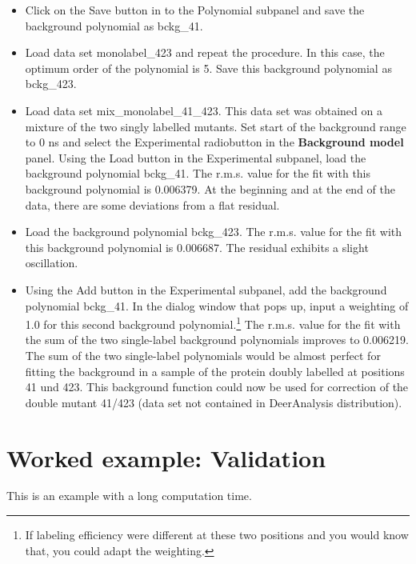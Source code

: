 \documentclass[11pt,a4paper]{article}
\begin{document}
\begin{itemize}
	\item Click on the {\ttfamily Save} button in to the {\ttfamily Polynomial} subpanel and save the background polynomial as {\ttfamily bckg\_41}.  
	\item Load data set {\ttfamily monolabel\_423} and repeat the procedure. In this case, the optimum order of the polynomial is 5. Save this background polynomial as {\ttfamily bckg\_423}.
	\item Load data set {\ttfamily mix\_monolabel\_41\_423}. This data set was obtained on a mixture of the two singly labelled mutants. Set start of the background range to 0 ns and select the {\ttfamily Experimental} radiobutton in the {\ttfamily \bf Background model} panel. Using the {\ttfamily Load} button in the {\ttfamily Experimental subpanel}, load the background polynomial {\ttfamily bckg\_41}. The r.m.s. value for the fit with this background polynomial is 0.006379. At the beginning and at the end of the data, there are some deviations from a flat residual.   
	\item Load the background polynomial {\ttfamily bckg\_423}. The r.m.s. value for the fit with this background polynomial is 0.006687. The residual exhibits a slight oscillation.   
	\item Using the {\ttfamily Add} button in the {\ttfamily Experimental subpanel}, add the background polynomial {\ttfamily bckg\_41}. In the dialog window that pops up, input a weighting of 1.0 for this second background polynomial.\footnote{If labeling efficiency were different at these two positions and you would know that, you could adapt the weighting.} The r.m.s. value for the fit with the sum of the two single-label background polynomials improves to 0.006219. The sum of the two single-label polynomials would be almost perfect for fitting the background in a sample of the protein doubly labelled at positions 41 und 423. This background function could now be used for correction of the double mutant 41/423 (data set not contained in DeerAnalysis distribution).
\end{itemize}

\section{Worked example: Validation}

This is an example with a long computation time.
\end{document}
